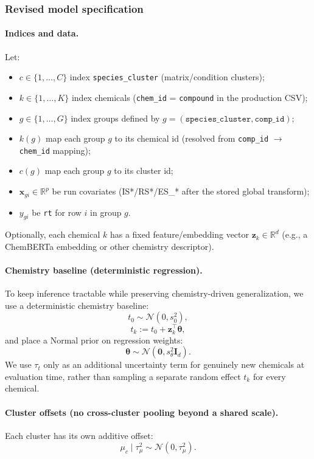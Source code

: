 \documentclass[11pt]{article}
\begin{document}
\subsubsection{Revised model specification}

\paragraph{Indices and data.}
Let:
\begin{itemize}
  \item $c \in \{1,\dots,C\}$ index \texttt{species\_cluster} (matrix/condition clusters);
  \item $k \in \{1,\dots,K\}$ index chemicals (\texttt{chem\_id} = \texttt{compound} in the production CSV);
  \item $g \in \{1,\dots,G\}$ index groups defined by $g = (\texttt{species\_cluster}, \texttt{comp\_id})$;
  \item $k(g)$ map each group $g$ to its chemical id (resolved from \texttt{comp\_id} $\rightarrow$ \texttt{chem\_id} mapping);
  \item $c(g)$ map each group $g$ to its cluster id;
  \item $\bm{x}_{gi} \in \mathbb{R}^p$ be run covariates (IS*/RS*/ES\_* after the stored global transform);
  \item $y_{gi}$ be \texttt{rt} for row $i$ in group $g$.
\end{itemize}

Optionally, each chemical $k$ has a fixed feature/embedding vector $\bm{z}_k \in \mathbb{R}^d$
(e.g., a ChemBERTa embedding or other chemistry descriptor).

\paragraph{Chemistry baseline (deterministic regression).}
To keep inference tractable while preserving chemistry-driven generalization, we use a deterministic chemistry baseline:
\[
  t_0 \sim \mathcal{N}(0, s_0^2),
\]
\[
  t_k := t_0 + \bm{z}_k^\top \bm{\theta},
\]
and place a Normal prior on regression weights:
\[
  \bm{\theta} \sim \mathcal{N}(\bm{0}, s_{\theta}^2 \bm{I}_d).
\]
We use $\tau_t$ only as an additional uncertainty term for genuinely new chemicals at evaluation time, rather than sampling a separate
random effect $t_k$ for every chemical.

\paragraph{Cluster offsets (no cross-cluster pooling beyond a shared scale).}
Each cluster has its own additive offset:
\[
  \mu_c \mid \tau_\mu^2 \sim \mathcal{N}(0, \tau_\mu^2).
\]
\end{document}
